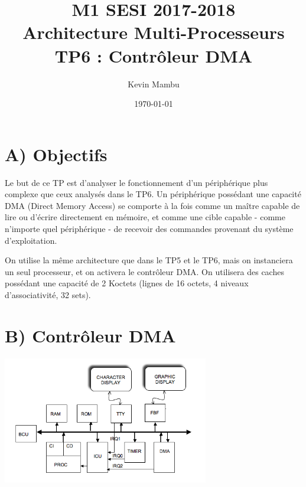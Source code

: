\documentclass[10pt]{article}
\author{Kevin Mambu}
\date{\today}
\title{M1 SESI 2017-2018\\Architecture Multi-Processeurs\\TP6 : Contrôleur DMA}
\begin{document}
\maketitle

\section{A) Objectifs}
Le but de ce TP est d’analyser le fonctionnement d'un périphérique plus complexe
que ceux analysés dans le TP6. Un périphérique possédant une capacité DMA
(Direct Memory Access) se comporte à la fois comme un maître capable de lire ou
d'écrire directement en mémoire, et comme une cible capable - comme n'importe
quel périphérique - de recevoir des commandes provenant du système
d'exploitation.

On utilise la même architecture que dans le TP5 et le TP6, mais on instanciera
un seul processeur, et on activera le contrôleur DMA. On utilisera des caches
possédant une capacité de 2 Koctets (lignes de 16 octets, 4 niveaux
d'associativité, 32 sets).

\section{B) Contrôleur DMA}
\begin{center}
  \includegraphics[width=9cm]{tp7_topcell_dma.png}
\end{center}
\end{document}
